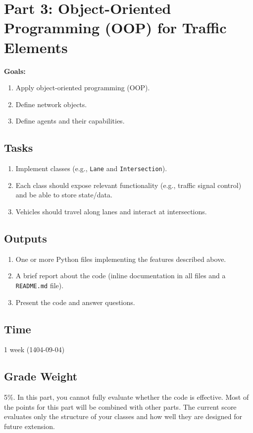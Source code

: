 \documentclass{KPS_assignment}
\begin{document}
\maketitle
\section*{Part 3: Object-Oriented Programming (OOP) for Traffic Elements}

\textbf{Goals:}
\begin{enumerate}
\item Apply object-oriented programming (OOP).
\item Define network objects.
\item Define agents and their capabilities.
\end{enumerate}

\subsection*{Tasks}
\begin{enumerate}
    \item Implement classes (e.g., \texttt{Lane} and \texttt{Intersection}).
    \item Each class should expose relevant functionality (e.g., traffic signal control) and be able to store state/data.
    \item Vehicles should travel along lanes and interact at intersections.
\end{enumerate}

\subsection*{Outputs}
\begin{enumerate}
\item One or more Python files implementing the features described above.
\item A brief report about the code (inline documentation in all files and a \texttt{README.md} file).
\item Present the code and answer questions.
\end{enumerate}

\subsection*{Time}
1 week (1404-09-04)

\subsection*{Grade Weight}
5\%. In this part, you cannot fully evaluate whether the code is effective. Most of the points for this part will be combined with other parts. The current score evaluates only the structure of your classes and how well they are designed for future extension.
\end{document}
